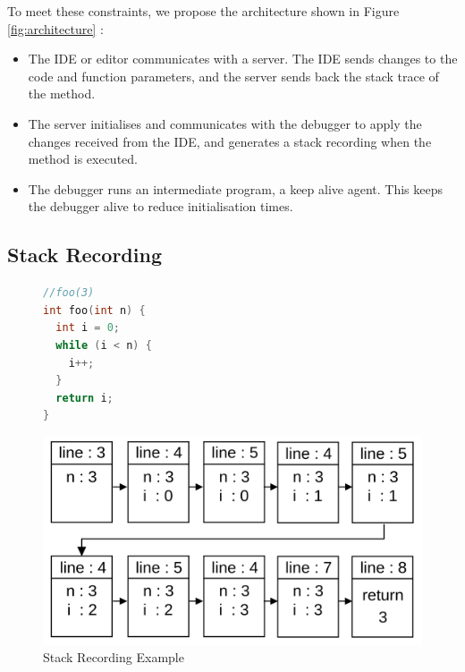 \documentclass[english,submission]{programming}
\begin{document}
To meet these constraints, we propose the architecture shown in Figure \ref{fig:architecture} :
\begin{itemize}
  \item The IDE or editor communicates with a server. The IDE sends changes to the code and function parameters, and the server sends back the stack trace of the method.
  \item The server initialises and communicates with the debugger to apply the changes received from the IDE, and generates a stack recording when the method is executed.
  \item The debugger runs an intermediate program, a keep alive agent. This keeps the debugger alive to reduce initialisation times.
\end{itemize}

\label{sec:stack-recording}

\subsection{Stack Recording}

\begin{figure}[h]
  \centering
  \begin{minipage}{0.25\textwidth}
    \centering
    \begin{lstlisting}[language=C]
//foo(3)
int foo(int n) {
  int i = 0;
  while (i < n) {
    i++;
  }
  return i;
}
    \end{lstlisting}
  \end{minipage}
  \hfill
  \begin{minipage}{0.7\textwidth}
    \centering
    \includegraphics[width=0.8\linewidth]{img/stackrecording_chain.png}
  \end{minipage}
  \caption{Stack Recording Example}
  \label{fig:stack-recording}
\end{figure}
\end{document}
